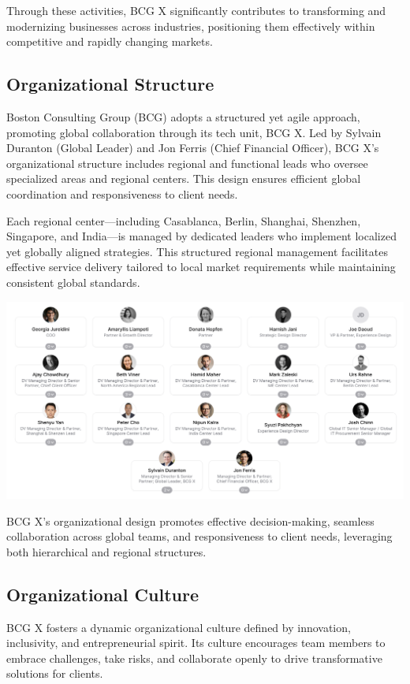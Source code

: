 Through these activities, BCG X significantly contributes to transforming and modernizing businesses across industries, positioning them effectively within competitive and rapidly changing markets.

\subsection{Organizational Structure}
Boston Consulting Group (BCG) adopts a structured yet agile approach, promoting global collaboration through its tech unit, BCG X. Led by Sylvain Duranton (Global Leader) and Jon Ferris (Chief Financial Officer), BCG X’s organizational structure includes regional and functional leads who oversee specialized areas and regional centers. This design ensures efficient global coordination and responsiveness to client needs.\mynewline

Each regional center—including Casablanca, Berlin, Shanghai, Shenzhen, Singapore, and India—is managed by dedicated leaders who implement localized yet globally aligned strategies. This structured regional management facilitates effective service delivery tailored to local market requirements while maintaining consistent global standards.

\begin{center}
    \includegraphics[width=\linewidth]{Images/Executive Leadership Board.png}
    \cite{executive-leadership-board}
    \label{fig:executive}
\end{center}
\noindent
\mynewline
BCG X’s organizational design promotes effective decision-making, seamless collaboration across global teams, and responsiveness to client needs, leveraging both hierarchical and regional structures.

\subsection{Organizational Culture}
BCG X fosters a dynamic organizational culture defined by innovation, inclusivity, and entrepreneurial spirit. Its culture encourages team members to embrace challenges, take risks, and collaborate openly to drive transformative solutions for clients.\mynewline

